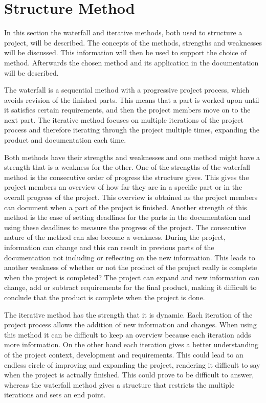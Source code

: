 \chapter*{Structure Method}
In this section the waterfall and iterative methods, both used to structure a project, will be described. The concepts of the methods, strengths and weaknesses will be discussed. This information will then be used to support the choice of method. Afterwards the chosen method and its application in the documentation will be described.

The waterfall is a sequential method with a progressive project process, which avoids revision of the finished parts. This means that a part is worked upon until it satisfies certain requirements, and then the project members move on to the next part. The iterative method focuses on multiple iterations of the project process and therefore iterating through the project multiple times, expanding the product and documentation each time.

Both methods have their strengths and weaknesses and one method might have a strength that is a weakness for the other. One of the strengths of the waterfall method is the consecutive order of progress the structure gives. This gives the project members an overview of how far they are in a specific part or in the overall progress of the project. This overview is obtained as the project members can document when a part of the project is finished. Another strength of this method is the ease of setting deadlines for the parts in the documentation and using these deadlines to measure the progress of the project. The consecutive nature of the method can also become a weakness. During the project, information can change and this can result in previous parts of the documentation not including or reflecting on the new information. This leads to another weakness of whether or not the product of the project really is complete when the project is completed? The project can expand and new information can change, add or subtract requirements for the final product, making it difficult to conclude that the product is complete when the project is done. 

The iterative method has the strength that it is dynamic. Each iteration of the project process allows the addition of new information and changes. When using this method it can be difficult to keep an overview because each iteration adds more information. On the other hand each iteration gives a better understanding of the project context, development and requirements. This could lead to an endless circle of improving and expanding the project, rendering it difficult to say when the project is actually finished. This could prove to be difficult to answer, whereas the waterfall method gives a structure that restricts the multiple iterations and sets an end point. 

